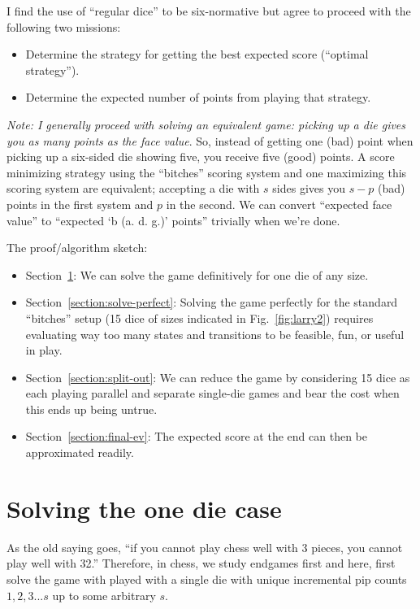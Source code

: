 \documentclass[11pt, oneside]{article} 	%
\begin{document}
I find the use of ``regular dice'' to be six-normative but agree to proceed with the following two missions:
\begin{itemize}
\item Determine the strategy for getting the best expected score (``optimal strategy'').
\item Determine the expected number of points from playing that strategy.
\end{itemize}

\emph{Note: I generally proceed with solving an equivalent game: picking up a die gives you as many points as the face value}.  So, instead of getting one (bad) point when picking up a six-sided die showing five, you receive five (good) points.  A score minimizing strategy using the ``bitches'' scoring system and one maximizing this scoring system are equivalent; accepting a die with $s$ sides gives you $s-p$ (bad) points in the first system and $p$ in the second.  We can convert ``expected face value'' to ``expected `b (a. d. g.)' points'' trivially when we're done.


The proof/algorithm sketch:
\begin{itemize}
\item Section~\ref{section:solve-one}: We can solve the game definitively for one die of any size.
\item Section~\ref{section:solve-perfect}: Solving the game perfectly for the standard ``bitches'' setup (15 dice of sizes indicated in Fig.~\ref{fig:larry2}) requires evaluating way too many states and transitions to be feasible, fun, or useful in play.
\item Section~\ref{section:split-out}: We can reduce the game by considering 15 dice as each playing parallel and separate single-die games and bear the cost when this ends up being untrue.
\item Section~\ref{section:final-ev}: The expected score at the end can then be approximated readily.
\end{itemize}

\section{Solving the one die case} \label{section:solve-one}

As the old saying goes, ``if you cannot play chess well with 3 pieces, you cannot play well with 32.''  Therefore, in chess, we study endgames first and here, first solve the game with played with a single die with unique incremental pip counts $1, 2, 3 ... s$ up to some arbitrary $s$.
\end{document}
